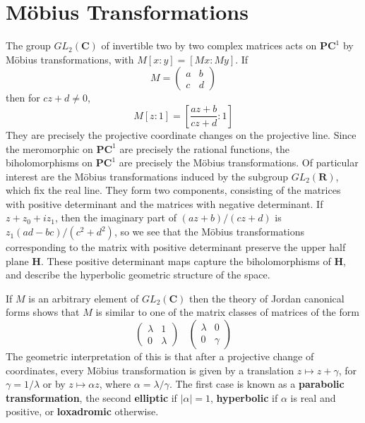 \section{M\"{o}bius Transformations}

The group $GL_2(\mathbf{C})$ of invertible two by two complex matrices acts on $\mathbf{PC}^1$ by M\"{o}bius transformations, with $M[x:y] = [Mx: My]$. If
%
\[ M = \begin{pmatrix} a & b \\ c & d \end{pmatrix} \]
%
then for $cz + d \neq 0$,
%
\[ M[z:1] = \left[ \frac{az + b}{cz + d}: 1 \right] \]
%
They are precisely the projective coordinate changes on the projective line. Since the meromorphic on $\mathbf{PC}^1$ are precisely the rational functions, the biholomorphisms on $\mathbf{PC}^1$ are precisely the M\"{o}bius transformations. Of particular interest are the M\"{o}bius transformations induced by the subgroup $GL_2(\mathbf{R})$, which fix the real line. They form two components, consisting of the matrices with positive determinant and the matrices with negative determinant. If $z + z_0 + i z_1$, then the imaginary part of $(az + b)/(cz + d)$ is $z_1(ad - bc)/(c^2 + d^2)$, so we see that the M\"{o}bius transformations corresponding to the matrix with positive determinant preserve the upper half plane $\mathbf{H}$. These positive determinant maps capture the biholomorphisms of $\mathbf{H}$, and describe the hyperbolic geometric structure of the space.

If $M$ is an arbitrary element of $GL_2(\mathbf{C})$ then the theory of Jordan canonical forms shows that $M$ is similar to one of the matrix classes of matrices of the form
%
\[ \begin{pmatrix} \lambda & 1 \\ 0 & \lambda \end{pmatrix}\ \ \ \ \begin{pmatrix} \lambda & 0 \\ 0 & \gamma \end{pmatrix} \]
%
The geometric interpretation of this is that after a projective change of coordinates, every M\"{o}bius transformation is given by a translation $z \mapsto z + \gamma$, for $\gamma = 1/\lambda$ or by $z \mapsto \alpha z$, where $\alpha = \lambda / \gamma$. The first case is known as a {\bf parabolic transformation}, the second {\bf elliptic} if $|\alpha| = 1$, {\bf hyperbolic} if $\alpha$ is real and positive, or {\bf loxadromic} otherwise.

